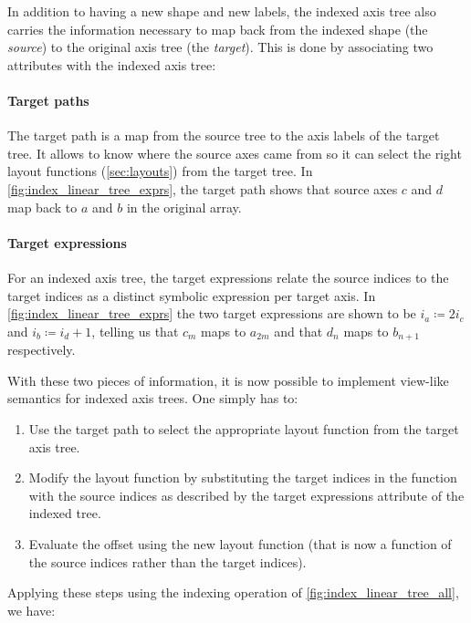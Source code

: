 \documentclass[thesis]{subfiles}
\begin{document}
In addition to having a new shape and new labels, the indexed axis tree also carries the information necessary to map back from the indexed shape (the \textit{source}) to the original axis tree (the \textit{target}).
This is done by associating two attributes with the indexed axis tree:

\paragraph{Target paths}

The target path is a map from the source tree to the axis labels of the target tree.
It allows  to know where the source axes came from so it can select the right layout functions (\cref{sec:layouts}) from the target tree.
In \cref{fig:index_linear_tree_exprs}, the target path shows that source axes $c$ and $d$ map back to $a$ and $b$ in the original array.

\paragraph{Target expressions}

For an indexed axis tree, the target expressions relate the source indices to the target indices as a distinct symbolic expression per target axis.
In \cref{fig:index_linear_tree_exprs} the two target expressions are shown to be $i_a \coloneq 2 i_c$ and $i_b \coloneq i_d + 1$, telling us that $c_m$ maps to $a_{2m}$ and that $d_n$ maps to $b_{n+1}$ respectively.

With these two pieces of information, it is now possible to implement view-like semantics for indexed axis trees.
One simply has to:

\begin{enumerate}
  \item
    Use the target path to select the appropriate layout function from the target axis tree.
  \item
    Modify the layout function by substituting the target indices in the function with the source indices as described by the target expressions attribute of the indexed tree.
  \item
    Evaluate the offset using the new layout function (that is now a function of the source indices rather than the target indices).
\end{enumerate}

Applying these steps using the indexing operation of \cref{fig:index_linear_tree_all}, we have:
\end{document}

